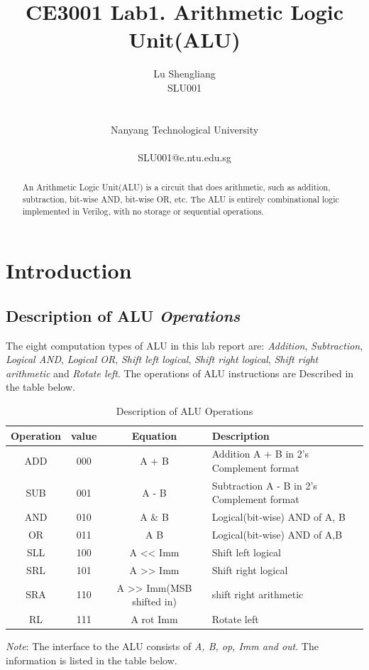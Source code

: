 \documentclass[11pt,fleqn]{article}
\title{CE3001 Lab1. Arithmetic Logic Unit(ALU)}
\author{
  Lu Shengliang \\
  SLU001\\
  \Organization{} \\
  \vspace*{-10mm} \\
  Nanyang Technological University \\
  \vspace*{-10mm} \\
  SLU001@e.ntu.edu.sg
}
\begin{document}
\maketitle

\begin{abstract}
An Arithmetic Logic Unit(ALU) is a circuit that does arithmetic, such as addition, subtraction, bit‐wise AND, bit‐wise OR, etc. The ALU is entirely combinational logic implemented in Verilog, with no storage or sequential operations.
\end{abstract}



\section{Introduction}

\label{sec:intro}

\subsection{Description of ALU {\em Operations}} 

The eight computation types of ALU in this lab report are: \emph{Addition}, \emph{Subtraction}, \emph{Logical AND}, \emph{Logical OR}, \emph{Shift left logical}, \emph{Shift right logical}, \emph{Shift right arithmetic} and \emph{Rotate left}. The operations of ALU instructions are Described in the table below.
\begin{table}
  \begin{tabular}{| c | c | c | l |}
    \hline
    \textbf{Operation} & \textbf{value} & \textbf{Equation} & \textbf{Description}\\ \hline
    ADD & 000 & A + B & Addition A + B in 2's Complement format\\ \hline
    SUB & 001 & A - B & Subtraction A - B in 2's Complement format\\ \hline
    AND & 010 & A \&{} B & Logical(bit‐wise) AND of A, B\\ \hline
    OR & 011 & A \textbar{} B & Logical(bit-wise) AND of A,B\\ \hline
    SLL & 100 & A \textless \textless{} Imm & Shift left logical\\ \hline
    SRL & 101 & A \textgreater \textgreater{} Imm & Shift right logical\\ \hline
    SRA & 110 & A \textgreater \textgreater{} Imm(MSB shifted in) & shift right arithmetic\\ \hline
    RL & 111 & A rot Imm & Rotate left\\
    \hline
  \end{tabular}
  
  \begin{tablenotes}
    \emph{Note}: The interface to the ALU consists of \emph{A, B, op, Imm and out}. The information is listed in the table below.
  \end{tablenotes}
  \caption{Description of ALU Operations}
\end{table}
\end{document}
